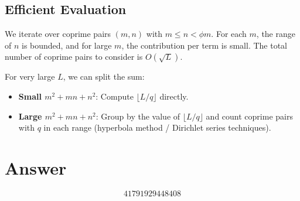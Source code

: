 \documentclass[12pt]{article}
\begin{document}
\subsection{Efficient Evaluation}
We iterate over coprime pairs $(m, n)$ with $m \leq n < \phi m$. For each $m$, the range of $n$ is bounded, and for large $m$, the contribution per term is small. The total number of coprime pairs to consider is $O(\sqrt{L})$.

For very large $L$, we can split the sum:
\begin{itemize}
\item \textbf{Small $m^2 + mn + n^2$}: Compute $\lfloor L/q \rfloor$ directly.
\item \textbf{Large $m^2 + mn + n^2$}: Group by the value of $\lfloor L/q \rfloor$ and count coprime pairs with $q$ in each range (hyperbola method / Dirichlet series techniques).
\end{itemize}

\section{Answer}

\[
\boxed{41791929448408}
\]
\end{document}
